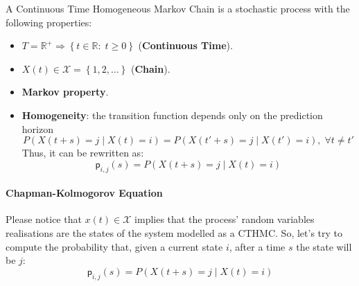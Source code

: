 \documentclass[12pt,a4paper]{article}
\newcommand*{\transp}{\mathsf{p}}
\begin{document}
\newpage\noindent
A Continuous Time Homogeneous Markov Chain is a stochastic process with the following properties:
\begin{itemize}
\item $T=\mathbb{R}^+\Rightarrow\left\lbrace t\in\mathbb{R}:\;t\geq 0\right\rbrace $ (\textbf{Continuous Time}).
\item $X(t)\in \mathcal{X}=\left\lbrace 1,2,\dots\right\rbrace$ (\textbf{Chain}).
\item \textbf{Markov property}.
\item \textbf{Homogeneity}: the transition function depends only on the prediction horizon
$$
P\left(X(t+s)=j \mid X(t)=i\right) = P\left(X(t'+s)=j \mid X(t')=i\right),\;\forall t\neq t'
$$
Thus, it can be rewritten as:
$$
\transp_{i,j}(s) = P\left(X(t+s)=j \mid X(t)=i\right)
$$
\end{itemize} 
\paragraph{Chapman-Kolmogorov Equation}
Please notice that $x(t)\in \mathcal{X}$ implies that the process' random variables realisations are the states of the system modelled as a CTHMC. So, let's try to compute the probability that, given a current state $i$, after a time $s$ the state will be $j$:
\begin{equation*}
\transp_{i,j}(s) = P\left(X(t+s)=j \mid X(t)=i\right)
\end{equation*}
\end{document}
